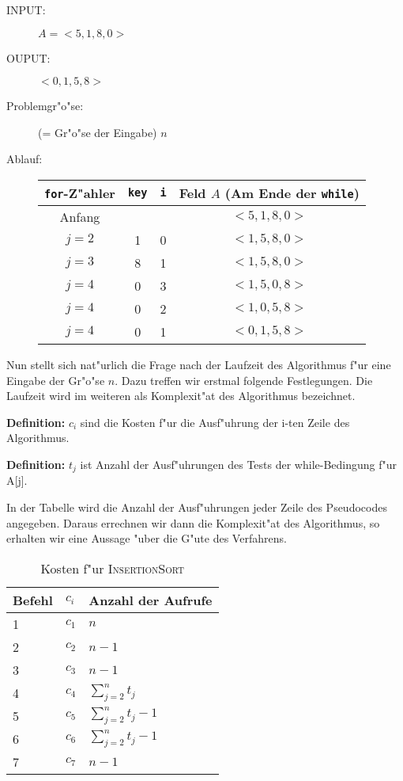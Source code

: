 \documentclass[draft,12pt]{scrreprt}
\theoremstyle{break}
\begin{document}
\begin{description}
 \item[INPUT:] $A=<5,1,8,0>$
 \item[OUPUT:] $<0,1,5,8>$
 \item[Problemgr"o"se:] (= Gr"o"se der Eingabe) $n$
 \item[Ablauf:]
  \begin{tabular}[t]{*{4}{c}}
    \texttt{for}-Z"ahler & \texttt{key} & \texttt{i} & Feld $A$
       {(\small Am Ende der \texttt{while})}\\
    \hline
    Anfang& & & $<5,1,8,0>$\\
    $j=2$ & 1 & 0 & $<1,5,8,0>$\\
    $j=3$ & 8 & 1 & $<1,5,8,0>$\\
    $j=4$ & 0 & 3 & $<1,5,0,8>$\\
    $j=4$ & 0 & 2 & $<1,0,5,8>$\\
    $j=4$ & 0 & 1 & $<0,1,5,8>$
  \end{tabular}
\end{description}

Nun stellt sich nat"urlich die Frage nach der Laufzeit des Algorithmus f"ur eine Eingabe der Gr"o"se $n$.
Dazu treffen wir erstmal folgende Festlegungen. Die Laufzeit wird im weiteren als Komplexit"at des Algorithmus bezeichnet.
\bigskip

\noindent \textbf {Definition:} $c_i$ sind die Kosten f"ur die Ausf"uhrung der i-ten Zeile des Algorithmus.

\noindent \textbf {Definition:} $t_j$ ist Anzahl der Ausf"uhrungen des Tests der while-Bedingung f"ur A[j].
\bigskip

In der Tabelle wird die Anzahl der Ausf"uhrungen jeder Zeile des Pseudocodes angegeben. Daraus errechnen wir dann
die Komplexit"at des Algorithmus, so erhalten wir eine Aussage "uber die G"ute des Verfahrens.

\begin{table}[h]
  \begin{tabular}{*{3}{l}}
    Befehl & $c_i$ & Anzahl der Aufrufe\\
    \hline
    1 & $c_1$ & $n$\\
    2 & $c_2$ & $n-1$\\
    3 & $c_3$ & $n-1$\\
    4 & $c_4$ & $\sum_{j=2}^{n}t_j$\\
    5 & $c_5$ & $\sum_{j=2}^{n}t_j-1$\\
    6 & $c_6$ & $\sum_{j=2}^{n}t_j-1$\\
    7 & $c_7$ & $n-1$\\
  \end{tabular}
  \caption{Kosten f"ur \textsc{InsertionSort}} 
\end{table}
\end{document}
